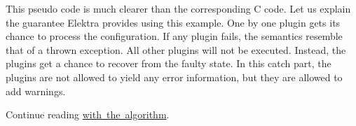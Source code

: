 \begin{DoxyCode}{0}
\DoxyCodeLine{}
\DoxyCodeLine{}
\end{DoxyCode}


This pseudo code is much clearer than the corresponding C code. Let us explain the guarantee Elektra provides using this example. One by one plugin gets its chance to process the configuration. If any plugin fails, the semantics resemble that of a thrown exception. All other plugins will not be executed. Instead, the plugins get a chance to recover from the faulty state. In this catch part, the plugins are not allowed to yield any error information, but they are allowed to add warnings.

Continue reading \mbox{\hyperlink{doc_dev_algorithm_md}{with the algorithm}}. 